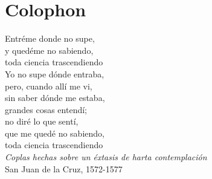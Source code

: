 %
\pagestyle{empty}
\hfill
\vfill
{}
\section*{Colophon}

Entréme donde no supe,\\ 
y quedéme no sabiendo,\\
toda ciencia trascendiendo\\ 

Yo no supe dónde entraba,\\
pero, cuando allí me vi,\\
sin saber dónde me estaba, \\
grandes cosas entendí;\\
no diré lo que sentí,\\
que me quedé no sabiendo,\\
toda ciencia trascendiendo \\


\textit{Coplas hechas sobre un éxtasis de harta contemplación} 
\\
San Juan de la Cruz, 1572-1577